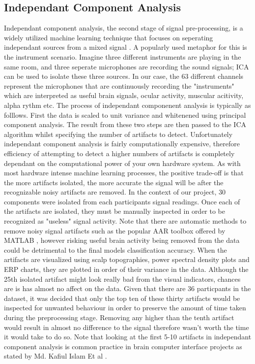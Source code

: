 \documentclass[11pt]{article}
\begin{document}
\subsection{Independant Component Analysis}

Independant component analysis, the second stage of signal pre-processing, is a widely utilized machine learning technique that focuses on seperating independant sources from a mixed signal \cite{Li2017AutomatedEA}. A popularly used metaphor for this is the instrument scenario. Imagine three different instruments are playing in the same room, and three seperate microphones are recording the sound signals; ICA can be used to isolate these three sources. In our case, the 63 different channels represent the microphones that are continuously recording the "instruments" which are interpreted as useful brain signals, ocular activity, muscular acitivity, alpha rythm etc. The process of independant componenent analysis is typically as folllows. First the data is scaled to unit variance and whitenened using principal component analysis. The result from these two steps are then passed to the ICA algorithm whilst specifying the number of artifacts to detect. Unfortunately independant component analysis is fairly computationally expensive, therefore efficiency of attempting to detect a higher numbers of artifacts is completely dependant on the computational power of your own hardware system. As with most hardware intense machine learning processes, the positive trade-off is that the more artifacts isolated, the more accurate the signal will be after the recognizable noisy artifacts are removed. In the context of our project, 30 components were isolated from each participants signal readings. Once each of the artifacts are isolated, they must be manually inspected in order to be recognized as "useless" signal activity. Note that there are automatic methods to remove noisy signal artifacts such as the popular AAR toolbox offered by MATLAB \cite{INDCA}, however risking useful brain activity being removed from the data could be detrimental to the final models classification accuracy. When the artifacts are visualized using scalp topographies, power spectral density plots and ERP charts, they are plotted in order of their variance in the data. Although the 25th isolated artifact might look really bad from the visual indicators, chances are is has almost no affect on the data. Given that there are 36 particpants in the dataset, it was decided that only the top ten of these thirty artifacts would be inspected for unwanted behaviour in order to preserve the amount of time taken during the preprocessing stage. Removing any higher than the tenth artifact would result in almost no difference to the signal therefore wasn't worth the time it would take to do so. Note that looking at the first 5-10 artifacts in independant component analysis is common practice in brain computer interface projects as stated by Md. Kafiul Islam Et al \cite{inbook}.
\end{document}
